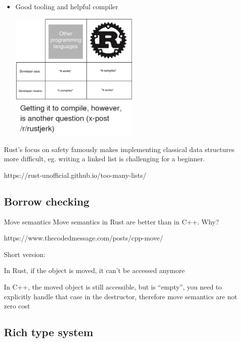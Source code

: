 \documentclass[
  9pt,
  ignorenonframetext,
]{beamer}
\begin{document}
\begin{frame}
\begin{itemize}
\item
  Good tooling and helpful compiler

  \includegraphics[width=0.5\textwidth,height=\textheight]{img/it_compiles_it_works.png}
\end{itemize}
\end{frame}

\begin{frame}
Rust's focus on safety famously makes implementing classical data
structures more difficult, eg. writing a linked list is challenging for
a beginner.

https://rust-unofficial.github.io/too-many-lists/
\end{frame}

\hypertarget{borrow-checking}{%
\subsection{Borrow checking}\label{borrow-checking}}

\begin{frame}{Move semantics}
\protect\hypertarget{move-semantics}{}
Move semantics in Rust are better than in C++. Why?

https://www.thecodedmessage.com/posts/cpp-move/

Short version:

In Rust, if the object is moved, it can't be accessed anymore

In C++, the moved object is still accessible, but is ``empty'', you need
to explicitly handle that case in the destructor, therefore move
semantics are not zero cost
\end{frame}

\hypertarget{rich-type-system}{%
\subsection{Rich type system}\label{rich-type-system}}
\end{document}
